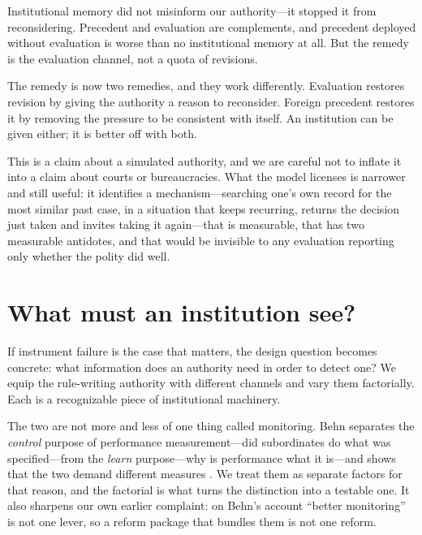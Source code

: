 \documentclass[11pt]{article}
\begin{document}
\begin{takeaway}
Institutional memory did not misinform our authority---it stopped it from reconsidering. Precedent
and evaluation are complements, and precedent deployed without evaluation is worse than no
institutional memory at all. But the remedy is the evaluation channel, not a quota of revisions.
\end{takeaway}

The remedy is now two remedies, and they work differently. Evaluation restores revision by
giving the authority a reason to reconsider. Foreign precedent restores it by removing the
pressure to be consistent with itself. An institution can be given either; it is better off
with both.


This is a claim about a simulated authority, and we are careful not to inflate it into a claim about
courts or bureaucracies. What the model licenses is narrower and still useful: it identifies a
mechanism---searching one's own record for the most similar past case, in a situation that keeps
recurring, returns the decision just taken and invites taking it again---that is measurable, that has
two measurable antidotes, and that would be invisible to any evaluation reporting only whether the
polity did well.

\section{What must an institution see?}
\label{sec:channels-social}

If instrument failure is the case that matters, the design question becomes concrete: what
information does an authority need in order to detect one? We equip the rule-writing authority with
different channels and vary them factorially. Each is a recognizable piece of institutional
machinery.

The two are not more and less of one thing called monitoring. Behn separates the \emph{control}
purpose of performance measurement---did subordinates do what was specified---from the \emph{learn}
purpose---why is performance what it is---and shows that the two demand different measures
\citep{behn2003measure}. We treat them as separate factors for that reason, and the factorial is what
turns the distinction into a testable one. It also sharpens our own earlier complaint: on Behn's
account ``better monitoring'' is not one lever, so a reform package that bundles them is not one
reform.
\end{document}
